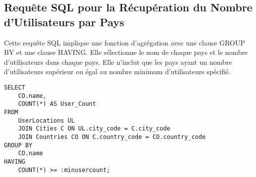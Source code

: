 \subsection{Requête SQL pour la Récupération du Nombre d'Utilisateurs par Pays}

Cette requête SQL implique une fonction d'agrégation avec une clause GROUP BY et une clause HAVING. Elle sélectionne le nom de chaque pays et le nombre d'utilisateurs dans chaque pays. Elle n'inclut que les pays ayant un nombre d'utilisateurs supérieur ou égal au nombre minimum d'utilisateurs spécifié.

\begin{lstlisting}
SELECT
    CO.name,
    COUNT(*) AS User_Count
FROM
    UserLocations UL
    JOIN Cities C ON UL.city_code = C.city_code
    JOIN Countries CO ON C.country_code = CO.country_code
GROUP BY
    CO.name
HAVING
    COUNT(*) >= :minusercount;
\end{lstlisting}